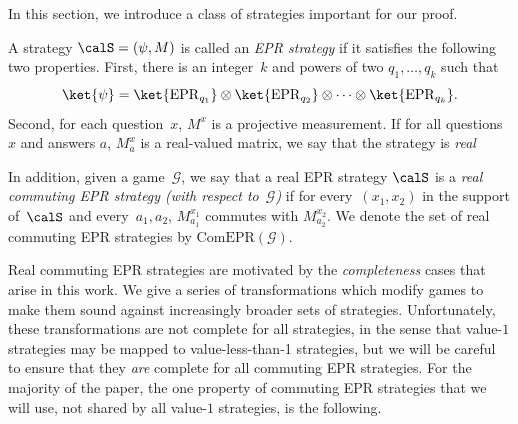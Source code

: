 \documentclass[11pt]{article}
\newcommand{\comstrat}[1]{\mathrm{ComEPR}(#1)}
\newcommand{\game}{\mathscr{G}}
\begin{document}
In this section, we introduce a class of strategies important for our proof.

\begin{definition}
A strategy $\calS = (\psi, M)$ is called an \emph{EPR strategy} if it satisfies the following two properties.
First, there is an integer~$k$ and powers of two $q_1, \ldots, q_k$ such that
\begin{equation*}
\ket{\psi} = \ket{\mathrm{EPR}_{q_1}} \otimes \ket{\mathrm{EPR}_{q_2}} \otimes \cdots \otimes \ket{\mathrm{EPR}_{q_k}}.
\end{equation*}
Second, for each question~$x$, $M^x$ is a projective measurement. If
for all questions $x$ and answers $a$, $M^x_a$ is a real-valued
matrix, we say that the strategy is \emph{real}

In addition, given a game~$\game$, we say that a real EPR strategy $\calS$ is a \emph{real
  commuting EPR strategy (with respect to~$\game$)}
if for every~$(x_1, x_2)$ in the support of~$\calS$ and every~$a_1, a_2$, $M^{x_1}_{a_1}$ commutes with $M^{x_2}_{a_2}$.
We denote the set of real commuting EPR strategies by $\comstrat{\game}$.
\end{definition}

Real commuting EPR strategies are motivated by the \emph{completeness} cases that arise in this work.
We give a series of transformations which modify games to make them sound against increasingly broader sets of strategies.
Unfortunately, these transformations are not complete for all strategies, in the sense that value-$1$ strategies may be mapped to value-less-than-1 strategies,
but we will be careful to ensure that they \emph{are} complete for all commuting EPR strategies.
For the majority of the paper, the one property of commuting EPR strategies that we will use, not shared by all value-$1$ strategies, is the following.
\end{document}

